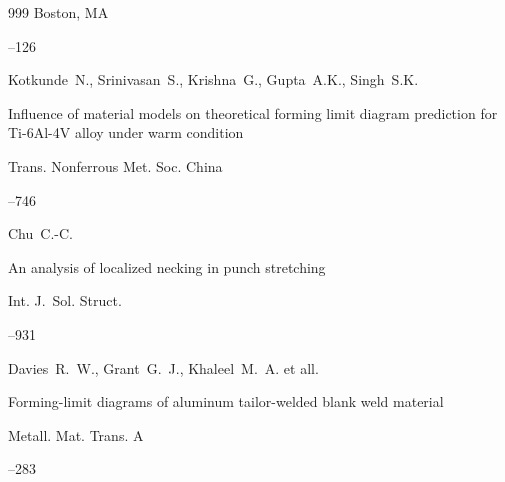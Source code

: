 \begin{thebibliography}{999}
\publaddr Boston, MA


–126





\by Kotkunde~N., Srinivasan~S., Krishna~G., Gupta~A.K., Singh~S.K.  

\paper Influence of material models on theoretical forming limit diagram prediction for Ti-6Al-4V alloy under warm condition

\jour Trans. Nonferrous Met. Soc. China



--746










\by Chu~C.-C. 

\paper An analysis of localized necking in punch stretching

\jour Int. J.~Sol. Struct.




--931






\by Davies~R.~W., Grant~G.~J., Khaleel~M.~A. et all.

\paper Forming-limit diagrams of aluminum tailor-welded blank weld material

\jour Metall. Mat. Trans. A




–283







\end{thebibliography}
